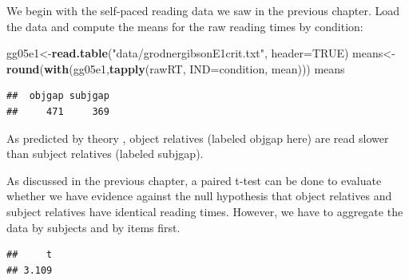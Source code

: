\documentclass[12pt,]{krantz}
\newenvironment{Shaded}{\begin{snugshade}}{\end{snugshade}}
\newcommand{\DataTypeTok}[1]{\textcolor[rgb]{0.13,0.29,0.53}{#1}}
\newcommand{\KeywordTok}[1]{\textcolor[rgb]{0.13,0.29,0.53}{\textbf{#1}}}
\newcommand{\NormalTok}[1]{#1}
\newcommand{\OperatorTok}[1]{\textcolor[rgb]{0.81,0.36,0.00}{\textbf{#1}}}
\newcommand{\OtherTok}[1]{\textcolor[rgb]{0.56,0.35,0.01}{#1}}
\newcommand{\StringTok}[1]{\textcolor[rgb]{0.31,0.60,0.02}{#1}}
\begin{document}
We begin with the \citet{grodner} self-paced reading data we saw in the previous chapter. Load the data and compute the means for the raw reading times by condition:

\begin{Shaded}
\begin{Highlighting}[]
\NormalTok{gg05e1<-}\KeywordTok{read.table}\NormalTok{(}\StringTok{"data/grodnergibsonE1crit.txt"}\NormalTok{,}
                   \DataTypeTok{header=}\OtherTok{TRUE}\NormalTok{)}
\NormalTok{means<-}\KeywordTok{round}\NormalTok{(}\KeywordTok{with}\NormalTok{(gg05e1,}\KeywordTok{tapply}\NormalTok{(rawRT,}
                                \DataTypeTok{IND=}\NormalTok{condition,}
\NormalTok{                            mean)))}
\NormalTok{means}
\end{Highlighting}
\end{Shaded}

\begin{verbatim}
##  objgap subjgap 
##     471     369
\end{verbatim}

As predicted by theory \citep{grodner}, object relatives (labeled objgap here) are read slower than subject relatives (labeled subjgap).

As discussed in the previous chapter, a paired t-test can be done to evaluate whether we have evidence against the null hypothesis that object relatives and subject relatives have identical reading times. However, we have to aggregate the data by subjects and by items first.

\begin{Shaded}
\end{Shaded}

\begin{verbatim}
##     t 
## 3.109
\end{verbatim}
\end{document}
